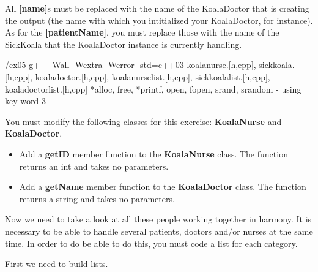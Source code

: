 \warn
{
  All \textbf{[name]}s must be replaced with the name of the KoalaDoctor that is
  creating the output (the name with which you intitialized your KoalaDoctor, for
  instance). As for the \textbf{[patientName]}, you must replace those with the name
  of the SickKoala that the KoalaDoctor instance is currently handling.
}

\newpage

\printCPPExerciseFormalities
{/ex05}
{g++ -Wall -Wextra -Werror -std=c++03}
{koalanurse.[h,cpp], sickkoala.[h,cpp], koaladoctor.[h,cpp], koalanurselist.[h,cpp],
sickkoalalist.[h,cpp], koaladoctorlist.[h,cpp]}
{*alloc, free, *printf, open, fopen, srand, srandom - using key word}
{3}


You must modify the following classes for this exercise: \textbf{KoalaNurse}
and \textbf{KoalaDoctor}.
\begin{itemize}

  \item Add a \textbf{getID} member function to the \textbf{KoalaNurse} class.
    The function returns an int and takes no parameters.

  \item Add a \textbf{getName} member function to the \textbf{KoalaDoctor} class.
    The function returns a string and takes no parameters.
\end{itemize}

Now we need to take a look at all these people working together in harmony. It
is necessary to be able to handle several patients, doctors and/or nurses at the
same time. In order to do be able to do this, you must code a list for each category.

First we need to build lists.\\
~\\

